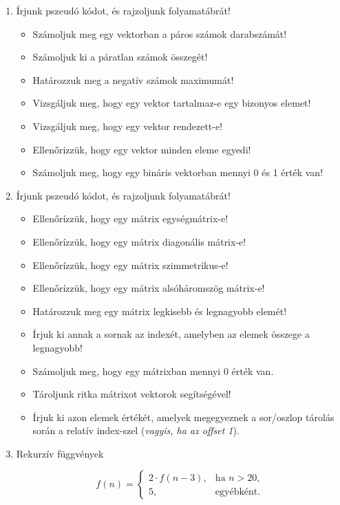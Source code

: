 \documentclass[a4paper]{article}
\begin{document}
\begin{enumerate}

\item

Írjunk pszeudó kódot, és rajzoljunk folyamatábrát!
\begin{itemize}
\item Számoljuk meg egy vektorban a páros számok darabszámát!
\item Számoljuk ki a páratlan számok összegét!
\item Határozzuk meg a negatív számok maximumát!
\item Vizsgáljuk meg, hogy egy vektor tartalmaz-e egy bizonyos elemet!
\item Vizsgáljuk meg, hogy egy vektor rendezett-e!
\item Ellenőrizzük, hogy egy vektor minden eleme egyedi!
\item Számoljuk meg, hogy egy bináris vektorban mennyi 0 és 1 érték van!
\end{itemize}

\item

Írjunk pszeudó kódot, és rajzoljunk folyamatábrát!
\begin{itemize}
\item Ellenőrízzük, hogy egy mátrix egységmátrix-e!
\item Ellenőrízzük, hogy egy mátrix diagonális mátrix-e!
\item Ellenőrízzük, hogy egy mátrix szimmetrikus-e!
\item Ellenőrízzük, hogy egy mátrix alsóháromszög mátrix-e!
\item Határozzuk meg egy mátrix legkisebb és legnagyobb elemét!
\item Írjuk ki annak a sornak az indexét, amelyben az elemek összege a legnagyobb!
\item Számoljuk meg, hogy egy mátrixban mennyi 0 érték van.
\item Tároljunk ritka mátrixot vektorok segítségével!
\item Írjuk ki azon elemek értékét, amelyek megegyeznek a sor/oszlop tárolás során a relatív index-szel (\textit{vagyis, ha az offset 1}).
\end{itemize}

\item

Rekurzív függvények

$$
f(n) =
\begin{cases}
2 \cdot f(n - 3), & \text{ha } n > 20, \\
5, & \text{egyébként. }
\end{cases}
$$


\end{enumerate}
\end{document}

